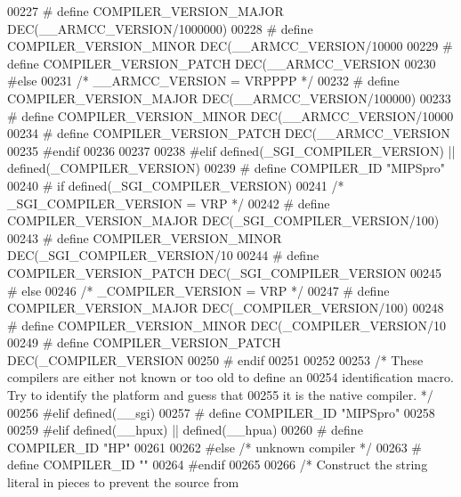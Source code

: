\begin{DoxyCode}
{{{{{{{{{{{{{{{{{{{{{{{{{{{00227 \textcolor{preprocessor}{  # define COMPILER\_VERSION\_MAJOR DEC(\_\_ARMCC\_VERSION/1000000)}
00228 \textcolor{preprocessor}{  # define COMPILER\_VERSION\_MINOR DEC(\_\_ARMCC\_VERSION/10000 %
00229 \textcolor{preprocessor}{  # define COMPILER\_VERSION\_PATCH DEC(\_\_ARMCC\_VERSION     %
00230 \textcolor{preprocessor}{#else}
00231   \textcolor{comment}{/* \_\_ARMCC\_VERSION = VRPPPP */}
00232 \textcolor{preprocessor}{  # define COMPILER\_VERSION\_MAJOR DEC(\_\_ARMCC\_VERSION/100000)}
00233 \textcolor{preprocessor}{  # define COMPILER\_VERSION\_MINOR DEC(\_\_ARMCC\_VERSION/10000 %
00234 \textcolor{preprocessor}{  # define COMPILER\_VERSION\_PATCH DEC(\_\_ARMCC\_VERSION    %
00235 \textcolor{preprocessor}{#endif}
00236 
00237 
00238 \textcolor{preprocessor}{#elif defined(\_SGI\_COMPILER\_VERSION) || defined(\_COMPILER\_VERSION)}
00239 \textcolor{preprocessor}{# define COMPILER\_ID "MIPSpro"}
00240 \textcolor{preprocessor}{# if defined(\_SGI\_COMPILER\_VERSION)}
00241   \textcolor{comment}{/* \_SGI\_COMPILER\_VERSION = VRP */}
00242 \textcolor{preprocessor}{#  define COMPILER\_VERSION\_MAJOR DEC(\_SGI\_COMPILER\_VERSION/100)}
00243 \textcolor{preprocessor}{#  define COMPILER\_VERSION\_MINOR DEC(\_SGI\_COMPILER\_VERSION/10 %
00244 \textcolor{preprocessor}{#  define COMPILER\_VERSION\_PATCH DEC(\_SGI\_COMPILER\_VERSION    %
00245 \textcolor{preprocessor}{# else}
00246   \textcolor{comment}{/* \_COMPILER\_VERSION = VRP */}
00247 \textcolor{preprocessor}{#  define COMPILER\_VERSION\_MAJOR DEC(\_COMPILER\_VERSION/100)}
00248 \textcolor{preprocessor}{#  define COMPILER\_VERSION\_MINOR DEC(\_COMPILER\_VERSION/10 %
00249 \textcolor{preprocessor}{#  define COMPILER\_VERSION\_PATCH DEC(\_COMPILER\_VERSION    %
00250 \textcolor{preprocessor}{# endif}
00251 
00252 
00253 \textcolor{comment}{/* These compilers are either not known or too old to define an}
00254 \textcolor{comment}{  identification macro.  Try to identify the platform and guess that}
00255 \textcolor{comment}{  it is the native compiler.  */}
00256 \textcolor{preprocessor}{#elif defined(\_\_sgi)}
00257 \textcolor{preprocessor}{# define COMPILER\_ID "MIPSpro"}
00258 
00259 \textcolor{preprocessor}{#elif defined(\_\_hpux) || defined(\_\_hpua)}
00260 \textcolor{preprocessor}{# define COMPILER\_ID "HP"}
00261 
00262 \textcolor{preprocessor}{#else }\textcolor{comment}{/* unknown compiler */}\textcolor{preprocessor}{}
00263 \textcolor{preprocessor}{# define COMPILER\_ID ""}
00264 \textcolor{preprocessor}{#endif}
00265 
00266 \textcolor{comment}{/* Construct the string literal in pieces to prevent the source from}
}}}}}}}}}}}}}}}}}}}}}}}}}}}}}}}}}}}
\end{DoxyCode}
